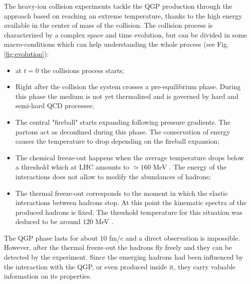 The heavy-ion collision experiments tackle the QGP production through the approach based on reaching an extreme temperature, thanks to the high energy available in the center of mass of the collision.
The collision process is characterized by a complex space and time evolution, but can be divided in some macro-conditions which can help understanding the whole process (see Fig. \ref{fig:evolution}):
\begin{itemize}
    \item at $t=0$ the collisions process starts;
    \item Right after the collision the system crosses a pre-equilibrium phase. During this phase the medium is not yet thermalized and is governed by hard and semi-hard QCD processes;
    \item The central "fireball" starts expanding following pressure gradients. The partons act as deconfined during this phase. The conservation of energy causes the temperature to drop depending on the fireball expansion;
    \item The chemical freeze-out happens when the average temperature drops below a threshold which at LHC amounts to $\simeq160$ MeV \cite{Kapoyannis:2017hcz}. The energy of the interactions does not allow to modify the abundances of hadrons;
    \item The thermal freeze-out corresponds to the moment in which the elastic interactions between hadrons stop. At this point the kinematic spectra of the produced hadrons is fixed. The threshold temperature for this situation was deduced to be around $120$ MeV \cite{Mukherjee:2012fb}.
\end{itemize}

The QGP phase lasts for about $10$ fm/c and a direct observation is impossible.
However, after the thermal freeze-out the hadrons fly freely and they can be detected by the experiment.
Since the emerging hadrons had been influenced by the interaction with the QGP, or even produced inside it, they carry valuable information on its properties.

